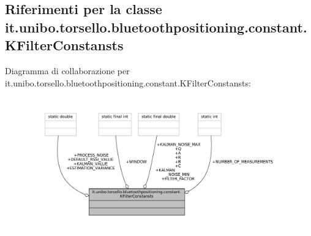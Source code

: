 \hypertarget{classit_1_1unibo_1_1torsello_1_1bluetoothpositioning_1_1constant_1_1KFilterConstansts}{}\subsection{Riferimenti per la classe it.\+unibo.\+torsello.\+bluetoothpositioning.\+constant.\+K\+Filter\+Constansts}
\label{classit_1_1unibo_1_1torsello_1_1bluetoothpositioning_1_1constant_1_1KFilterConstansts}


Diagramma di collaborazione per it.\+unibo.\+torsello.\+bluetoothpositioning.\+constant.\+K\+Filter\+Constansts\+:
\nopagebreak
\begin{figure}[H]
\begin{center}
\leavevmode
\includegraphics[width=350pt]{classit_1_1unibo_1_1torsello_1_1bluetoothpositioning_1_1constant_1_1KFilterConstansts__coll__graph}
\end{center}
\end{figure}
